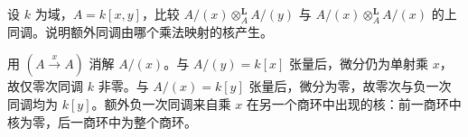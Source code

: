\begin{optionalexercise}\label{b4:ex:20-derived-intersection-transverse}
	设 \(k\) 为域，\(A=k[x,y]\)，比较 \(A/(x)\otimes_A^{\mathbf L}A/(y)\) 与 \(A/(x)\otimes_A^{\mathbf L}A/(x)\) 的上同调。说明额外同调由哪个乘法映射的核产生。
\end{optionalexercise}
\begin{solution}
	用 \((A\xrightarrow{x}A)\) 消解 \(A/(x)\)。与 \(A/(y)=k[x]\) 张量后，微分仍为单射乘 \(x\)，故仅零次同调 \(k\) 非零。与 \(A/(x)=k[y]\) 张量后，微分为零，故零次与负一次同调均为 \(k[y]\)。额外负一次同调来自乘 \(x\) 在另一个商环中出现的核：前一商环中核为零，后一商环中为整个商环。
\end{solution}
